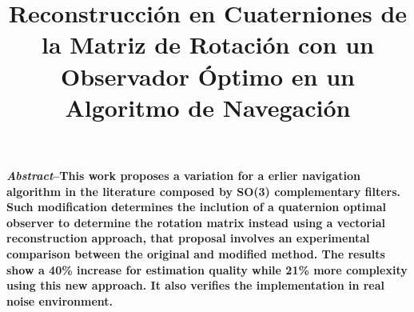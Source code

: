 \documentclass[conference]{IEEEtran}
\begin{document}
%
\title{Reconstrucción en Cuaterniones de la Matriz de Rotación con un Observador Óptimo en un Algoritmo de Navegación}
% 
\author{
}
\maketitle
\textbf{\small \emph{Abstract}--This work proposes a variation for a erlier navigation algorithm in the literature composed by SO(3) complementary filters. Such modification determines the inclution of a quaternion optimal observer to determine the rotation matrix instead using a vectorial reconstruction approach, that proposal involves an experimental comparison between the original and modified method. The results show a 40\% increase for estimation quality while 21\% more complexity using this new approach. It also verifies the implementation in real noise environment.\\[3mm]}
\end{document}
